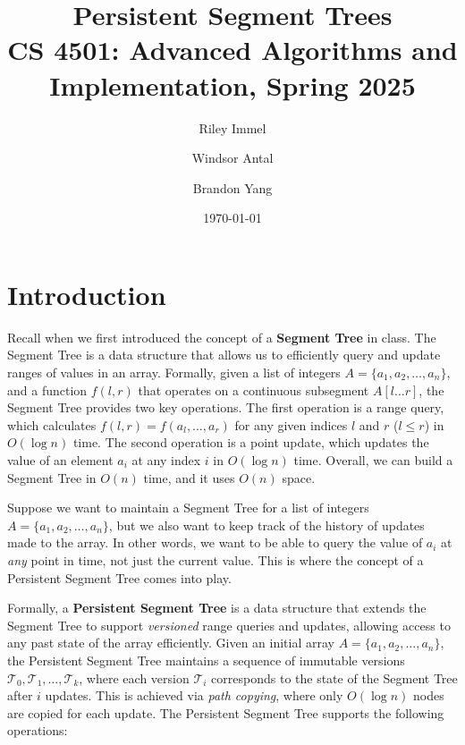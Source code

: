 \documentclass{fairmeta}
\title{Persistent Segment Trees\\
\large{CS 4501: Advanced Algorithms and Implementation, Spring 2025\\}
}
\author[1]{Riley Immel}
\author[1]{Windsor Antal}
\author[1]{Brandon Yang}
\affiliation[1]{University of Virginia}
\date{\today}
\numberwithin{equation}{section}
\begin{document}
\maketitle


\section{Introduction}\label{section:intro}

Recall when we first introduced the concept of a \textbf{Segment Tree} in class. The Segment Tree is a data structure that allows us to efficiently query and update ranges of values in an array. Formally, given a list of integers $A = \{a_1, a_2, \dots, a_n\}$, and a function $f(l, r)$ that operates on a continuous subsegment $A[l \dots r]$, the Segment Tree provides two key operations. The first operation is a range query, which calculates $f(l, r) = f(a_l, \dots, a_r)$ for any given indices $l$ and $r$ ($l \le r$) in $O(\log n)$ time. The second operation is a point update, which updates the value of an element $a_i$ at any index $i$ in $O(\log n)$ time. Overall, we can build a Segment Tree in $O(n)$ time, and it uses $O(n)$ space.

Suppose we want to maintain a Segment Tree for a list of integers $A = \{a_1, a_2, \dots, a_n\}$, but we also want to keep track of the history of updates made to the array. In other words, we want to be able to query the value of $a_i$ at \textit{any} point in time, not just the current value. This is where the concept of a Persistent Segment Tree comes into play.

Formally, a \textbf{Persistent Segment Tree} is a data structure that extends the Segment Tree to support \textit{versioned}  range queries and updates, allowing access to any past state of the array efficiently. Given an initial array $A = \{a_1, a_2, \dots, a_n\}$, the Persistent Segment Tree maintains a sequence of immutable versions $\mathcal{T}_0, \mathcal{T}_1, \dots, \mathcal{T}_k$, where each version $\mathcal{T}_i$ corresponds to the state of the Segment Tree after $i$ updates. This is achieved via \textit{path copying}, where only $O(\log n)$ nodes are copied for each update. The Persistent Segment Tree supports the following operations:
\end{document}
